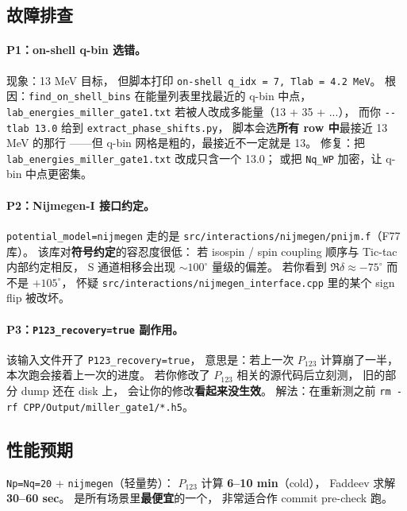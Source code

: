 \subsection{故障排查}
\label{sec:ch20-s4-pitfalls}

\paragraph{P1：on-shell q-bin 选错。}
现象：13 MeV 目标，
但脚本打印 \texttt{on-shell q\_idx = 7, Tlab = 4.2 MeV}。
根因：\texttt{find\_on\_shell\_bins} 在能量列表里找最近的 q-bin 中点，
\texttt{lab\_energies\_miller\_gate1.txt} 若被人改成多能量（13 + 35 + ...），
而你 \texttt{-{}-tlab 13.0} 给到 \texttt{extract\_phase\_shifts.py}，
脚本会选\textbf{所有 row 中}最接近 13 MeV 的那行
——但 q-bin 网格是粗的，最接近不一定就是 13。
修复：把 \texttt{lab\_energies\_miller\_gate1.txt} 改成只含一个 13.0；
或把 \texttt{Nq\_WP} 加密，让 q-bin 中点更密集。

\paragraph{P2：Nijmegen-I 接口约定。}
\texttt{potential\_model=nijmegen} 走的是 \texttt{src/interactions/nijmegen/pnijm.f}（F77 库）。
该库对\textbf{符号约定}的容忍度很低：
若 isospin / spin coupling 顺序与 Tic-tac 内部约定相反，
S 通道相移会出现 $\sim 100^\circ$ 量级的偏差。
若你看到 $\Re \delta \approx -75^\circ$ 而不是 $+105^\circ$，
怀疑 \texttt{src/interactions/nijmegen\_interface.cpp} 里的某个 sign flip 被改坏。

\paragraph{P3：\texttt{P123\_recovery=true} 副作用。}
该输入文件开了 \texttt{P123\_recovery=true}，
意思是：若上一次 $P_{123}$ 计算崩了一半，
本次跑会接着上一次的进度。
若你修改了 $P_{123}$ 相关的源代码后立刻测，
旧的部分 dump 还在 disk 上，
会让你的修改\textbf{看起来没生效}。
解法：在重新测之前 \texttt{rm -rf CPP/Output/miller\_gate1/*.h5}。

\subsection{性能预期}
\label{sec:ch20-s4-perf}

\texttt{Np=Nq=20} + \texttt{nijmegen}（轻量势）：
$P_{123}$ 计算 \textbf{6--10 min}（cold），
Faddeev 求解 \textbf{30--60 sec}。
是所有场景里\textbf{最便宜}的一个，
非常适合作 commit pre-check 跑。

